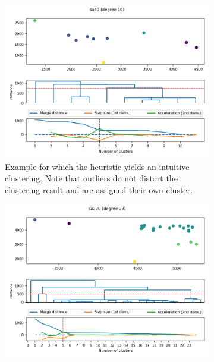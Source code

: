 \documentclass[
	fontsize=10pt, %
	twoside=false, %
	secnumdepth=1, %
  toc=indentunnumbered %
]{kaobook}
\begin{document}
\begin{figure}[h]
  \centering
  \begin{subfigure}{0.48\linewidth}
    \includegraphics[width=1.0\textwidth]{dendrograms/sa40.png}
    \caption{
      Example for which the heuristic yields an intuitive clustering. Note that
      outliers do not distort the clustering result and are assigned their own cluster.
    }
  \end{subfigure}
  \begin{subfigure}{0.48\linewidth}
    \includegraphics[width=\textwidth]{dendrograms/sa220.png}

\end{subfigure}
\end{figure}
\end{document}
